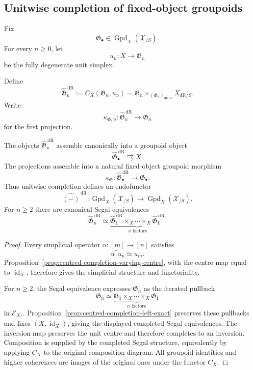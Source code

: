 \subsection{Unitwise completion of fixed-object groupoids}

Fix
\[
    \mathfrak G_\bullet
    \in
    \operatorname{Gpd}_X(\mathcal X_{/S}).
\]
For every $n\geq0$, let
\[
    u_n:X\longrightarrow\mathfrak G_n
\]
be the fully degenerate unit simplex.

\begin{definition}
\label{def:unitwise-groupoid-completion}
Define
\[
    \widehat{\mathfrak G}^{\,\mathrm{dR}}_n
    :=
    C_X(\mathfrak G_n,u_n)
    =
    \mathfrak G_n
    \times_{(\mathfrak G_n)_{\mathrm{dR}/S}}
    X_{\mathrm{dR}/S}.
\]
Write
\[
    \kappa_{\mathfrak G,n}:
    \widehat{\mathfrak G}^{\,\mathrm{dR}}_n
    \longrightarrow
    \mathfrak G_n
\]
for the first projection.
\end{definition}

\begin{proposition}
\label{prop:unitwise-completion-groupoid}
The objects
$\widehat{\mathfrak G}^{\,\mathrm{dR}}_n$ assemble canonically into a
groupoid object
\[
    \widehat{\mathfrak G}^{\,\mathrm{dR}}_\bullet
    \rightrightarrows X.
\]
The projections assemble into a natural fixed-object groupoid morphism
\[
    \kappa_{\mathfrak G}:
    \widehat{\mathfrak G}^{\,\mathrm{dR}}_\bullet
    \longrightarrow
    \mathfrak G_\bullet.
\]
Thus unitwise completion defines an endofunctor
\[
    \widehat{(-)}^{\,\mathrm{dR}}:
    \operatorname{Gpd}_X(\mathcal X_{/S})
    \longrightarrow
    \operatorname{Gpd}_X(\mathcal X_{/S}).
\]
For $n\ge2$ there are canonical Segal equivalences
\[
    \widehat{\mathfrak G}^{\,\mathrm{dR}}_n
    \simeq
    \underbrace{
    \widehat{\mathfrak G}^{\,\mathrm{dR}}_1
    \times_X\cdots\times_X
    \widehat{\mathfrak G}^{\,\mathrm{dR}}_1
    }_{n\text{ factors}}.
\]
\end{proposition}

\begin{proof}
Every simplicial operator $\alpha:[m]\to[n]$ satisfies
\[
    \alpha^*u_n\simeq u_m.
\]
Proposition~\ref{prop:centred-completion-varying-centre}, with the centre map
equal to $\operatorname{id}_X$, therefore gives the simplicial structure and
functoriality.

For $n\geq2$, the Segal equivalence expresses $\mathfrak G_n$ as the
iterated pullback
\[
    \mathfrak G_n
    \simeq
    \underbrace{
    \mathfrak G_1\times_X\cdots\times_X\mathfrak G_1
    }_{n\text{ factors}}
\]
in $\mathcal E_{X/}$.  Proposition~\ref{prop:centred-completion-left-exact}
preserves these pullbacks and fixes $(X,\operatorname{id}_X)$, giving the
displayed completed Segal equivalences.  The inversion map preserves the unit
centre and therefore completes to an inversion.  Composition is supplied by
the completed Segal structure, equivalently by applying $C_X$ to the original
composition diagram.  All groupoid identities and higher coherences are images
of the original ones under the functor $C_X$.
\end{proof}

